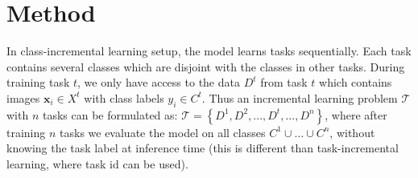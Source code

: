\documentclass[10pt,twocolumn,letterpaper]{article}
\begin{document}


\section{Method}
\label{sec:method}



In class-incremental learning setup, the model learns tasks sequentially. Each task contains several classes which are disjoint with the classes in other tasks. During training task $t$, we only have access to the data $D^t$ from task $t$ which contains images $\mathbf{x}_{i} \in X^t$ with class labels $y_i \in C^t$. Thus an incremental learning problem $\mathcal{T}$ with $n$ tasks can be formulated as: 
$\mathcal{T}=\left \{ D^1, D^2,...,D^t,..., D^n \right \}$,
where after training $n$ tasks we evaluate the model on all classes $ C^{1} \cup \ldots \cup C^n$, without knowing the task label at inference time (this is different than task-incremental learning, where task id can be used).
\end{document}

